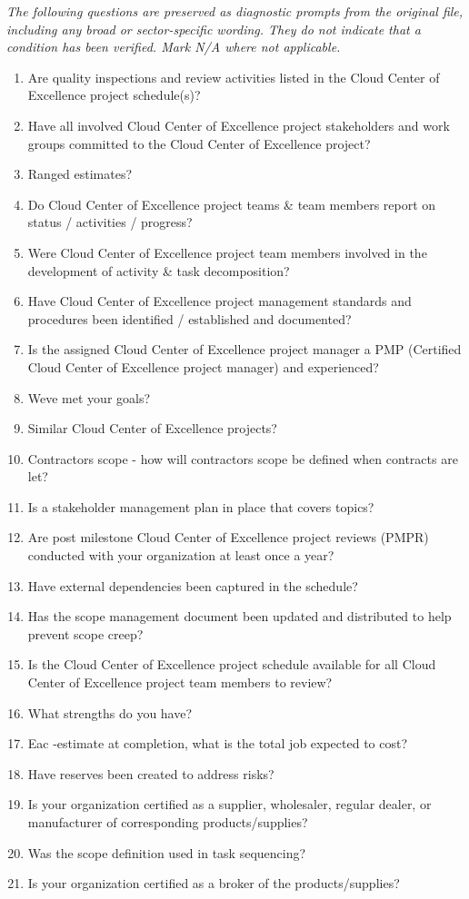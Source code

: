 \documentclass[10pt,letterpaper]{article}
\newcommand{\docsection}[1]{\par\Needspace{5\baselineskip}\vspace{8pt}{\large\sffamily\bfseries\color{navy}#1}\par\vspace{2pt}{\color{rulegrey}\rule{\linewidth}{.6pt}}\par}
\begin{document}
\docsection{03 \quad Source diagnostic checklist}
\textit{The following questions are preserved as diagnostic prompts from the original file, including any broad or sector-specific wording. They do not indicate that a condition has been verified. Mark N/A where not applicable.}
\begingroup\small\begin{enumerate}[leftmargin=2.1em, itemsep=4pt]
\item[1.] Are quality inspections and review activities listed in the Cloud Center of Excellence project schedule(s)?
\item[2.] Have all involved Cloud Center of Excellence project stakeholders and work groups committed to the Cloud Center of Excellence project?
\item[3.] Ranged estimates?
\item[4.] Do Cloud Center of Excellence project teams \& team members report on status / activities / progress?
\item[5.] Were Cloud Center of Excellence project team members involved in the development of activity \& task decomposition?
\item[6.] Have Cloud Center of Excellence project management standards and procedures been identified / established and documented?
\item[7.] Is the assigned Cloud Center of Excellence project manager a PMP (Certified Cloud Center of Excellence project manager) and experienced?
\item[8.] Weve met your goals?
\item[9.] Similar Cloud Center of Excellence projects?
\item[10.] Contractors scope - how will contractors scope be defined when contracts are let?
\item[11.] Is a stakeholder management plan in place that covers topics?
\item[12.] Are post milestone Cloud Center of Excellence project reviews (PMPR) conducted with your organization at least once a year?
\item[13.] Have external dependencies been captured in the schedule?
\item[14.] Has the scope management document been updated and distributed to help prevent scope creep?
\item[15.] Is the Cloud Center of Excellence project schedule available for all Cloud Center of Excellence project team members to review?
\item[16.] What strengths do you have?
\item[17.] Eac -estimate at completion, what is the total job expected to cost?
\item[18.] Have reserves been created to address risks?
\item[19.] Is your organization certified as a supplier, wholesaler, regular dealer, or manufacturer of corresponding products/supplies?
\item[20.] Was the scope definition used in task sequencing?
\item[21.] Is your organization certified as a broker of the products/supplies?
\end{enumerate}\endgroup
\end{document}
